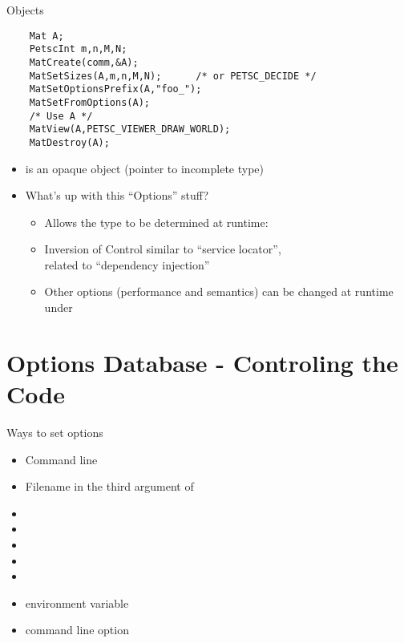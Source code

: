 
\begin{frame}[fragile]{Objects}
  \begin{verbatim}
    Mat A;
    PetscInt m,n,M,N;
    MatCreate(comm,&A);
    MatSetSizes(A,m,n,M,N);      /* or PETSC_DECIDE */ 
    MatSetOptionsPrefix(A,"foo_");
    MatSetFromOptions(A);
    /* Use A */
    MatView(A,PETSC_VIEWER_DRAW_WORLD);
    MatDestroy(A);
  \end{verbatim}
  \begin{itemize}
  \item {} is an opaque object (pointer to incomplete type)
  \item What's up with this ``Options'' stuff?
    \begin{itemize}
    \item Allows the type to be determined at runtime: 
    \item Inversion of Control similar to ``service locator'', \\
      related to ``dependency injection''
    \item Other options (performance and semantics) can be changed at
      runtime under 
    \end{itemize}
  \end{itemize}
\end{frame}



\section{Options Database - Controling the Code}
\begin{frame}{Ways to set options}
  \begin{itemize}
  \item Command line
  \item Filename in the third argument of 
  \item {}
  \item {}
  \item {}
  \item {}
  \item {}
  \item {} environment variable
  \item command line option 
  \end{itemize}
\end{frame}

